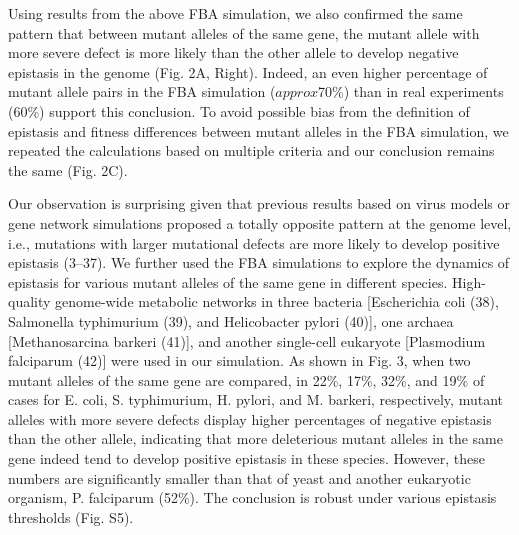 Using results from the above FBA simulation, we also confirmed the
same pattern that between mutant alleles of the same gene, the mutant
allele with more severe defect is more likely than the other allele to
develop negative epistasis in the genome (Fig. 2A, Right). Indeed, an
even higher percentage of mutant allele pairs in the FBA simulation
($approx$70\%) than in real experiments (60\%) support this
conclusion. To avoid possible bias from the definition of epistasis
and fitness differences between mutant alleles in the FBA simulation,
we repeated the calculations based on multiple criteria and our
conclusion remains the same (Fig. 2C).

Our observation is surprising given that previous results based on
virus models or gene network simulations proposed a totally opposite
pattern at the genome level, i.e., mutations with larger mutational
defects are more likely to develop positive epistasis (3–37). We
further used the FBA simulations to explore the dynamics of epistasis
for various mutant alleles of the same gene in different
species. High-quality genome-wide metabolic networks in three bacteria
[Escherichia coli (38), Salmonella typhimurium (39), and Helicobacter
pylori (40)], one archaea [Methanosarcina barkeri (41)], and another
single-cell eukaryote [Plasmodium falciparum (42)] were used in our
simulation. As shown in Fig. 3, when two mutant alleles of the same
gene are compared, in 22\%, 17\%, 32\%, and 19\% of cases for E. coli,
S. typhimurium, H. pylori, and M. barkeri, respectively, mutant
alleles with more severe defects display higher percentages of
negative epistasis than the other allele, indicating that more
deleterious mutant alleles in the same gene indeed tend to develop
positive epistasis in these species. However, these numbers are
significantly smaller than that of yeast and another eukaryotic
organism, P. falciparum (52\%). The conclusion is robust under various
epistasis thresholds (Fig. S5).

